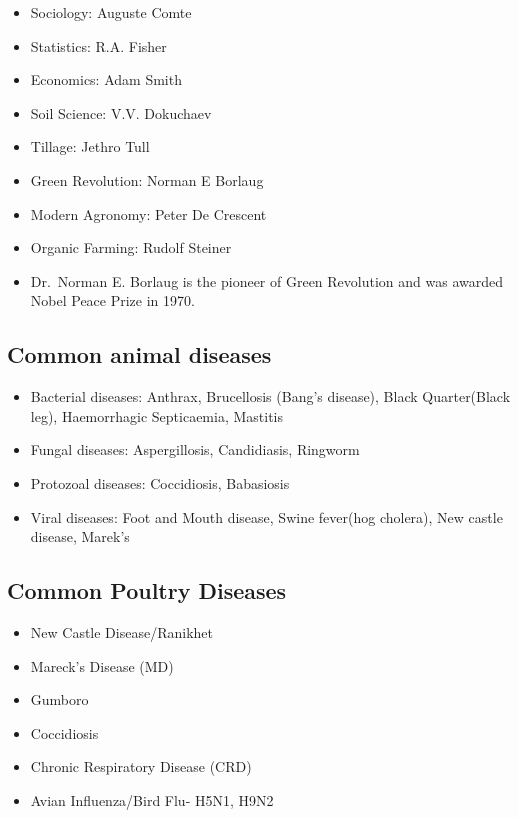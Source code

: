 \documentclass[
  openany]{book}
\providecommand{\tightlist}{%
  \setlength{\itemsep}{0pt}\setlength{\parskip}{0pt}}
\begin{document}
\begin{itemize}
\tightlist
\item
  Sociology: Auguste Comte
\item
  Statistics: R.A. Fisher
\item
  Economics: Adam Smith
\item
  Soil Science: V.V. Dokuchaev
\item
  Tillage: Jethro Tull
\item
  Green Revolution: Norman E Borlaug
\item
  Modern Agronomy: Peter De Crescent
\item
  Organic Farming: Rudolf Steiner
\item
  Dr.~Norman E. Borlaug is the pioneer of Green Revolution and was awarded Nobel Peace Prize in 1970.
\end{itemize}

\hypertarget{common-animal-diseases}{%
\subsection{Common animal diseases}\label{common-animal-diseases}}

\begin{itemize}
\tightlist
\item
  Bacterial diseases: Anthrax, Brucellosis (Bang's disease), Black Quarter(Black leg), Haemorrhagic Septicaemia, Mastitis
\item
  Fungal diseases: Aspergillosis, Candidiasis, Ringworm
\item
  Protozoal diseases: Coccidiosis, Babasiosis
\item
  Viral diseases: Foot and Mouth disease, Swine fever(hog cholera), New castle disease, Marek's
\end{itemize}

\hypertarget{common-poultry-diseases}{%
\subsection{Common Poultry Diseases}\label{common-poultry-diseases}}

\begin{itemize}
\tightlist
\item
  New Castle Disease/Ranikhet
\item
  Mareck's Disease (MD)
\item
  Gumboro
\item
  Coccidiosis
\item
  Chronic Respiratory Disease (CRD)
\item
  Avian Influenza/Bird Flu- H5N1, H9N2
\end{itemize}
\end{document}
